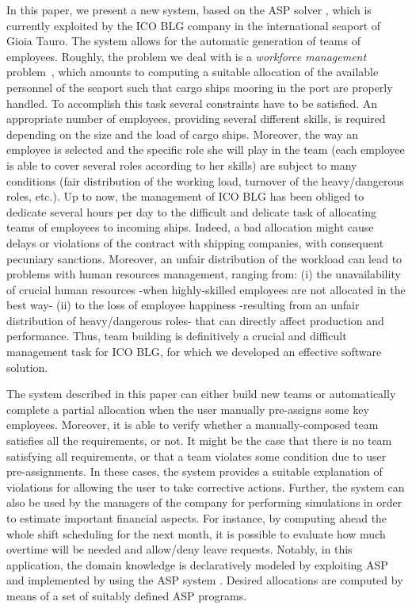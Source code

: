 \documentclass{tlp}
\begin{document}
In this paper, we present a new system, based on the ASP solver \dlv,
which is currently exploited by the ICO BLG company
in the international seaport of Gioia Tauro. The system allows for
the automatic generation of teams of employees.
Roughly, the problem we deal with is a {\em workforce management} problem~\cite{nave-etal-2007,erns-etal,tien-etal,lau,yang},
which amounts to computing a suitable
allocation of the available personnel of the seaport
such that cargo ships mooring in the port
are properly handled.
To accomplish this task several constraints have to be satisfied.
An appropriate number of employees, providing several different skills,
is required depending on the size and the load of cargo ships.
Moreover, the way an employee is selected and the specific role she will play in the team
(each employee is able to cover several roles according to her skills)
are subject to many conditions (\egc fair distribution of the working
load, turnover of the heavy/dangerous roles, etc.).
Up to now, the management of ICO BLG has been obliged to dedicate several hours
per day to the difficult and delicate task of allocating teams of employees
to incoming ships. Indeed, a bad allocation might cause delays or violations
of the contract with shipping companies, with
consequent pecuniary sanctions.
Moreover, an unfair distribution of the workload can lead to problems
with human resources management, ranging from: (i) the unavailability of crucial human resources
-when highly-skilled employees are not allocated in the best way-
(ii) to the loss of employee happiness  -resulting from an unfair distribution of heavy/dangerous roles-
that can directly affect production and performance.
Thus, team building is definitively a crucial and difficult management task for ICO BLG,
for which we developed an effective software solution.

The system described in this paper can either build new teams or automatically complete a partial allocation
when the user manually pre-assigns some key employees.
Moreover, it is able to verify whether a manually-composed team satisfies all the requirements, or not.
It might be the case that there is no team satisfying all requirements, or
that a team violates some condition due to user pre-assignments. In these cases,
the system provides a suitable explanation of violations
for allowing the user to take corrective actions.
Further, the system can also be used by the managers of the company for performing simulations in order to estimate important financial aspects. For instance, by computing ahead the whole shift scheduling for the next month, it is possible to evaluate how much overtime will be needed and
allow/deny leave requests.
Notably, in this application, the domain knowledge is declaratively modeled by exploiting ASP
and implemented by using the ASP system \dlv.
Desired allocations are computed by means of a set of suitably defined ASP programs.
\end{document}
